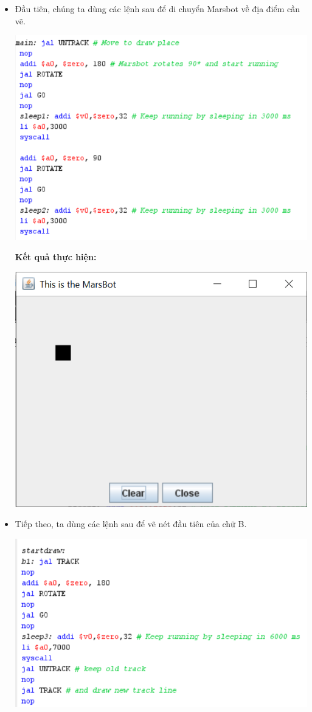 \documentclass[12pt,a4paper,oneside]{article}
\begin{document}
\begin{itemize}
\item Đầu tiên, chúng ta dùng các lệnh sau để di chuyển Marsbot về địa điểm cần vẽ.
\begin{center}
\includegraphics[scale=1]{1}
\end{center}
\textbf{Kết quả thực hiện:}
\begin{center}
\includegraphics[scale=1]{2}
\end{center}
\pagebreak
\item Tiếp theo, ta dùng các lệnh sau để vẽ nét đầu tiên của chữ B.
\begin{center}
\includegraphics[scale=1]{3}

\end{center}
\end{itemize}
\end{document}
